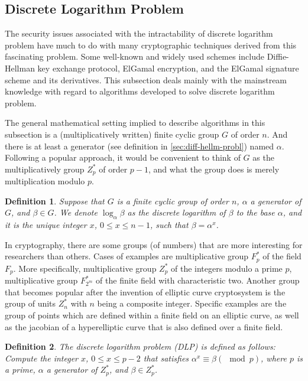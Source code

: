 \documentclass[12pt,journal,compsoc]{IEEEtran}
\newtheorem{definition}{Definition}
\begin{document}
\subsection{Discrete Logarithm Problem}
\label{sec:disctr-logar-probl}
The security issues associated with the intractability of discrete
logarithm problem have much to do with many cryptographic techniques
derived from this fascinating problem. Some well-known and widely used
schemes include Diffie-Hellman key exchange protocol, ElGamal
encryption, and the ElGamal signature scheme and its derivatives. This
subsection deals mainly with the mainstream knowledge with regard to
algorithms developed to solve discrete logarithm problem.
\par
The general mathematical setting implied to describe algorithms in
this subsection is a (multiplicatively written) finite cyclic group
$G$ of order $n$. And there is at least a generator (see definition in
\ref{sec:diff-hellm-probl}) named $\alpha$. Following a popular
approach, it would be convenient to think of $G$ as the
multiplicatively group $Z^{*}_{p}$ of order $p-1$, and what the group
does is merely multiplication modulo $p$.
\begin{definition}
Suppose that $G$ is a finite cyclic group of order
$n$, $\alpha$ a generator of $G$, and $\beta\in G$. We denote
$\log_{\alpha}\beta$ as the discrete logarithm of $\beta$ to the base
$\alpha$, and it is the unique integer $x$, $0\leq x\leq n-1$, such
that $\beta=\alpha^{x}$.
\end{definition}
In cryptography, there are some groups (of numbers) that are more
interesting for researchers than others. Cases of examples are
multiplicative group $F^{*}_{p}$ of the field $F_{p}$. More
specifically, multiplicative group $Z^{*}_{p}$ of the integers modulo
a prime $p$, multiplicative group $F^{*}_{2^{m}}$ of the finite field
with characteristic two. Another group that becomes popular after the
invention of elliptic curve cryptosystem is the group of units
$Z^{*}_{n}$ with $n$ being a composite integer. Specific examples are
the group of points which are defined within a finite field on an
elliptic curve, as well as the jacobian of a hyperelliptic curve that
is also defined over a finite field.
\begin{definition}
The \emph{discrete logarithm problem} (DLP) is
defined as follows: Compute the integer $x$, $0\leq x\leq p-2$ that
satisfies $\alpha^{x}\equiv \beta(\mod p)$, where $p$ is a prime,
$\alpha$ a generator of $Z^{*}_{p}$, and $\beta\in Z^{*}_{p}$.
\end{definition}
\end{document}
